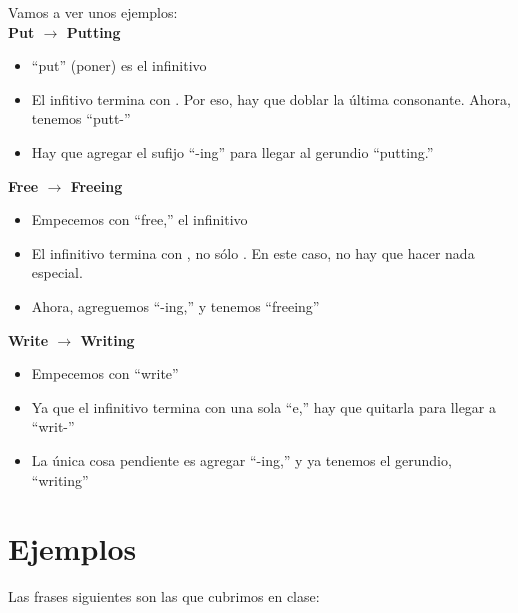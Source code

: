 Vamos a ver unos ejemplos:\\

\textbf{Put $\rightarrow$ Putting}
\begin{itemize}[noitemsep]
	\item ``put'' (poner) es el infinitivo
	\item El infitivo termina con . Por eso, hay que doblar la última consonante. Ahora, tenemos ``putt-''
	\item Hay que agregar el sufijo ``-ing'' para llegar al gerundio ``putting.''
\end{itemize}

\textbf{Free $\rightarrow$ Freeing}
\begin{itemize}[noitemsep]
	\item Empecemos con ``free,'' el infinitivo
	\item El infinitivo termina con , no sólo . En este caso, no hay que hacer nada especial.
	\item Ahora, agreguemos ``-ing,'' y tenemos ``freeing''
\end{itemize}

\textbf{Write $\rightarrow$ Writing}
\begin{itemize}[noitemsep]
	\item Empecemos con ``write''
	\item Ya que el infinitivo termina con una sola ``e,'' hay que quitarla para llegar a ``writ-''
	\item La única cosa pendiente es agregar ``-ing,'' y ya tenemos el gerundio, ``writing''
\end{itemize}

\section{Ejemplos}
Las frases siguientes son las que cubrimos en clase:

